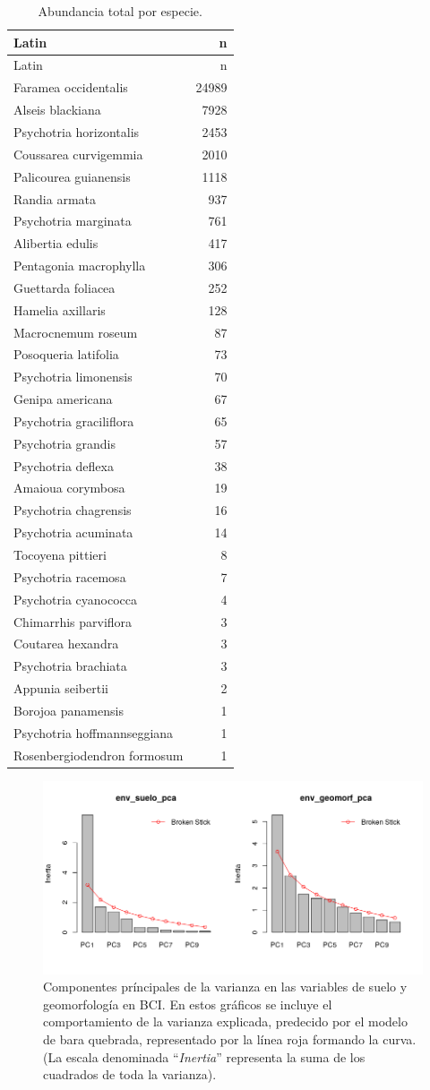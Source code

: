 \documentclass[11pt,]{article}
\begin{document}
\beginsupplement

\begin{longtable}[]{@{}lr@{}}
\caption{\label{tab:abun_sp}Abundancia total por
especie.}\tabularnewline
\toprule
Latin & n\tabularnewline
\midrule
\endfirsthead
\toprule
Latin & n\tabularnewline
\midrule
\endhead
Faramea occidentalis & 24989\tabularnewline
Alseis blackiana & 7928\tabularnewline
Psychotria horizontalis & 2453\tabularnewline
Coussarea curvigemmia & 2010\tabularnewline
Palicourea guianensis & 1118\tabularnewline
Randia armata & 937\tabularnewline
Psychotria marginata & 761\tabularnewline
Alibertia edulis & 417\tabularnewline
Pentagonia macrophylla & 306\tabularnewline
Guettarda foliacea & 252\tabularnewline
Hamelia axillaris & 128\tabularnewline
Macrocnemum roseum & 87\tabularnewline
Posoqueria latifolia & 73\tabularnewline
Psychotria limonensis & 70\tabularnewline
Genipa americana & 67\tabularnewline
Psychotria graciliflora & 65\tabularnewline
Psychotria grandis & 57\tabularnewline
Psychotria deflexa & 38\tabularnewline
Amaioua corymbosa & 19\tabularnewline
Psychotria chagrensis & 16\tabularnewline
Psychotria acuminata & 14\tabularnewline
Tocoyena pittieri & 8\tabularnewline
Psychotria racemosa & 7\tabularnewline
Psychotria cyanococca & 4\tabularnewline
Chimarrhis parviflora & 3\tabularnewline
Coutarea hexandra & 3\tabularnewline
Psychotria brachiata & 3\tabularnewline
Appunia seibertii & 2\tabularnewline
Borojoa panamensis & 1\tabularnewline
Psychotria hoffmannseggiana & 1\tabularnewline
Rosenbergiodendron formosum & 1\tabularnewline
\bottomrule
\end{longtable}

\begin{figure}
\centering
\includegraphics{env_suelo_geomorf_pca_br_stick.png}
\caption{Componentes príncipales de la varianza en las variables de
suelo y geomorfología en BCI. En estos gráficos se incluye el
comportamiento de la varianza explicada, predecido por el modelo de bara
quebrada, representado por la línea roja formando la curva. (La escala
denominada ``\emph{Inertia}'' representa la suma de los cuadrados de
toda la varianza). \label{fig:pca_suelo_geomorf_br_stick}}
\end{figure}
\end{document}
